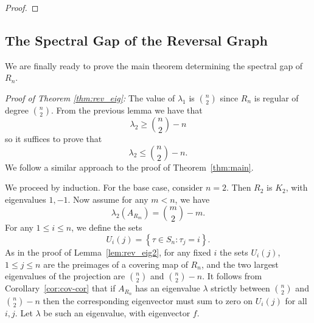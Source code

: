 \begin{proof}
  
%
%
%
\end{proof}

\subsection{The Spectral Gap of the Reversal Graph}

We are finally ready to prove the main theorem determining the spectral gap of $R_n$.

\noindent
{\it Proof of Theorem \ref{thm:rev_eig}:}
 The value of $\lambda_1$ is $\binom n 2$ since $R_n$ is regular of degree $\binom n 2$.   
 From the previous lemma we have that 
  \[ \lambda_2 \geq \binom{n}{2} - n\]
 so it suffices to prove that
  \[ \lambda_2 \leq \binom{n}{2} - n .\]
 We follow a similar approach to the proof of 
 Theorem~\ref{thm:main}.  
 
 
 We proceed by induction.  For the base case, consider $n=2$.  Then $R_2$
 is $K_2$, with eigenvalues $1,-1$.  Now assume for any $m < n$, we have
 \[  \lambda_2(A_{R_m}) = \binom{m}{2} - m . \]
 For any $1 \leq i \leq n$, we define the sets
  \[ U_i(j) = \left\{ \tau \in S_n : \tau_j = i \right\}. \]
 As in the proof of Lemma~\ref{lem:rev_eig2}, for any fixed $i$ the sets 
 $U_i(j)$, $1 \leq j \leq n$ are the preimages of a covering map of $R_n$,
 and the two largest eigenvalues of the projection are $\binom{n}{2}$ and
 $\binom{n}{2} - n$.  It follows from Corollary~\ref{cor:cov-cor}
 that if $A_{R_n}$ has an eigenvalue $\lambda$ strictly between $\binom{n}{2}$
 and $\binom{n}{2} - n$ then the corresponding eigenvector must sum to zero
 on $U_i(j)$ for all $i,j$.  Let $\lambda$ be such an eigenvalue, with 
 eigenvector $f$.
 
